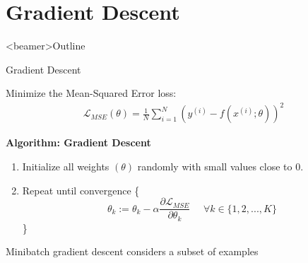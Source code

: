 \section{Gradient Descent}

\begin{frame}<beamer>{Outline}
\end{frame}

\begin{frame}{Gradient Descent}

	Minimize the Mean-Squared Error loss:
	\begin{align*}
	\mathcal{L}_{MSE} (\theta) = \frac{1}{N}\sum_{i=1}^N ( y^{(i)} - f(x^{(i)}; \theta))^2
	\end{align*}
	
	\textbf{Algorithm: Gradient Descent}
	\begin{enumerate}
	\item Initialize all weights $(\theta)$ randomly with small values close to 0.
	\item Repeat until convergence \{
	\begin{equation*}
	\theta_k := \theta_k - \alpha \frac{\partial \mathcal{L}_{MSE}}{\partial \theta_k} \hspace{16pt} \forall k \in \{1,2,...,K\}
	\end{equation*}
	\}
	\end{enumerate}
	
	Minibatch gradient descent considers a subset of examples

\end{frame}